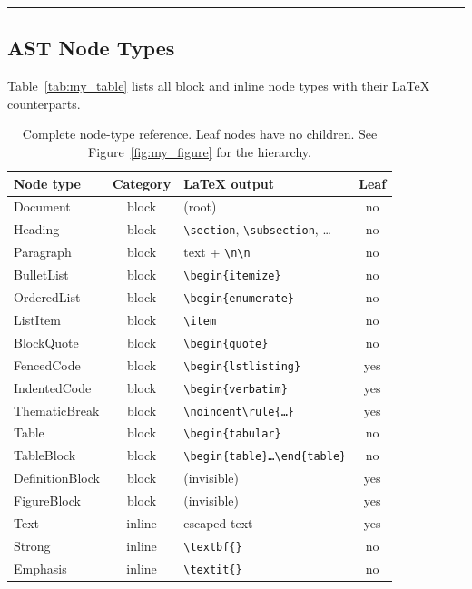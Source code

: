 \documentclass{article}
\begin{document}
\noindent\rule{\linewidth}{0.4pt}

\subsection{AST Node Types}

Table~\ref{tab:my_table} lists all block and inline node types with their LaTeX counterparts.

\begin{table}[H]
\centering
\caption{Complete node-type reference. Leaf nodes have no children. See Figure~\ref{fig:my_figure} for the hierarchy.}
\begin{tabular}{lclc}
\toprule
Node type & Category & LaTeX output & Leaf \\
\midrule
Document & block & (root) & no \\
Heading & block & \texttt{\textbackslash{}section}, \texttt{\textbackslash{}subsection}, … & no \\
Paragraph & block & text + \texttt{\textbackslash{}n\textbackslash{}n} & no \\
BulletList & block & \texttt{\textbackslash{}begin\{itemize\}} & no \\
OrderedList & block & \texttt{\textbackslash{}begin\{enumerate\}} & no \\
ListItem & block & \texttt{\textbackslash{}item} & no \\
BlockQuote & block & \texttt{\textbackslash{}begin\{quote\}} & no \\
FencedCode & block & \texttt{\textbackslash{}begin\{lstlisting\}} & yes \\
IndentedCode & block & \texttt{\textbackslash{}begin\{verbatim\}} & yes \\
ThematicBreak & block & \texttt{\textbackslash{}noindent\textbackslash{}rule\{…\}} & yes \\
Table & block & \texttt{\textbackslash{}begin\{tabular\}} & no \\
TableBlock & block & \texttt{\textbackslash{}begin\{table\}…\textbackslash{}end\{table\}} & no \\
DefinitionBlock & block & (invisible) & yes \\
FigureBlock & block & (invisible) & yes \\
Text & inline & escaped text & yes \\
Strong & inline & \texttt{\textbackslash{}textbf\{\}} & no \\
Emphasis & inline & \texttt{\textbackslash{}textit\{\}} & no \\

\end{tabular}
\end{table}
\end{document}

